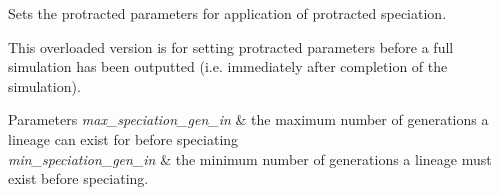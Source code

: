 Sets the protracted parameters for application of protracted speciation. 

This overloaded version is for setting protracted parameters before a full simulation has been outputted (i.\+e. immediately after completion of the simulation).


\begin{DoxyParams}{Parameters}
{\em max\+\_\+speciation\+\_\+gen\+\_\+in} & the maximum number of generations a lineage can exist for before speciating \\
\hline
{\em min\+\_\+speciation\+\_\+gen\+\_\+in} & the minimum number of generations a lineage must exist before speciating. \\
\hline
\end{DoxyParams}
